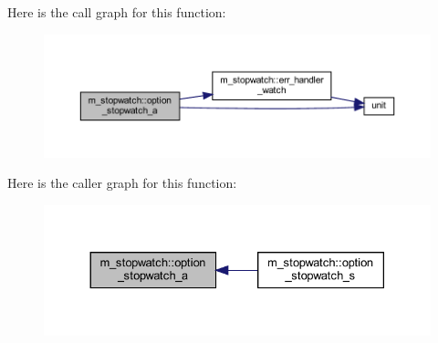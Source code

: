 Here is the call graph for this function\+:
\nopagebreak
\begin{figure}[H]
\begin{center}
\leavevmode
\includegraphics[width=350pt]{namespacem__stopwatch_a01b27391a14a126d017fdacb139d92ca_cgraph}
\end{center}
\end{figure}
Here is the caller graph for this function\+:
\nopagebreak
\begin{figure}[H]
\begin{center}
\leavevmode
\includegraphics[width=330pt]{namespacem__stopwatch_a01b27391a14a126d017fdacb139d92ca_icgraph}
\end{center}
\end{figure}
\mbox{\label{namespacem__stopwatch_a9667f04e61746b7d2b74e9de0d707af0}} 

